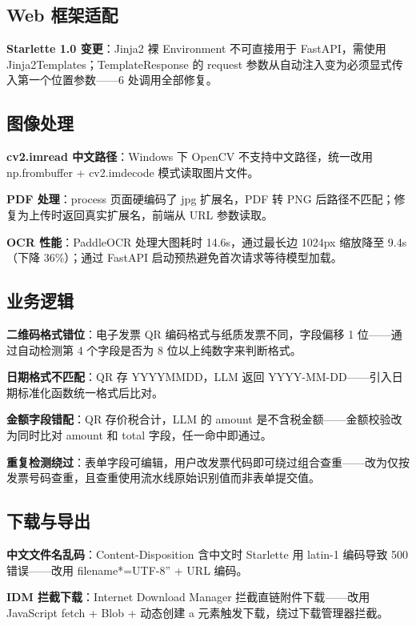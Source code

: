 \documentclass[12pt,a4paper]{ctexart}
\begin{document}
\subsection{Web 框架适配}

\textbf{Starlette 1.0 变更}：Jinja2 裸 Environment 不可直接用于 FastAPI，需使用 Jinja2Templates；TemplateResponse 的 request 参数从自动注入变为必须显式传入第一个位置参数——6 处调用全部修复。

\subsection{图像处理}

\textbf{cv2.imread 中文路径}：Windows 下 OpenCV 不支持中文路径，统一改用 np.frombuffer + cv2.imdecode 模式读取图片文件。

\textbf{PDF 处理}：process 页面硬编码了 jpg 扩展名，PDF 转 PNG 后路径不匹配；修复为上传时返回真实扩展名，前端从 URL 参数读取。

\textbf{OCR 性能}：PaddleOCR 处理大图耗时 14.6s，通过最长边 1024px 缩放降至 9.4s（下降 36\%）；通过 FastAPI 启动预热避免首次请求等待模型加载。

\subsection{业务逻辑}

\textbf{二维码格式错位}：电子发票 QR 编码格式与纸质发票不同，字段偏移 1 位——通过自动检测第 4 个字段是否为 8 位以上纯数字来判断格式。

\textbf{日期格式不匹配}：QR 存 YYYYMMDD，LLM 返回 YYYY-MM-DD——引入日期标准化函数统一格式后比对。

\textbf{金额字段错配}：QR 存价税合计，LLM 的 amount 是不含税金额——金额校验改为同时比对 amount 和 total 字段，任一命中即通过。

\textbf{重复检测绕过}：表单字段可编辑，用户改发票代码即可绕过组合查重——改为仅按发票号码查重，且查重使用流水线原始识别值而非表单提交值。

\subsection{下载与导出}

\textbf{中文文件名乱码}：Content-Disposition 含中文时 Starlette 用 latin-1 编码导致 500 错误——改用 filename*=UTF-8'' + URL 编码。

\textbf{IDM 拦截下载}：Internet Download Manager 拦截直链附件下载——改用 JavaScript fetch + Blob + 动态创建 a 元素触发下载，绕过下载管理器拦截。
\end{document}
